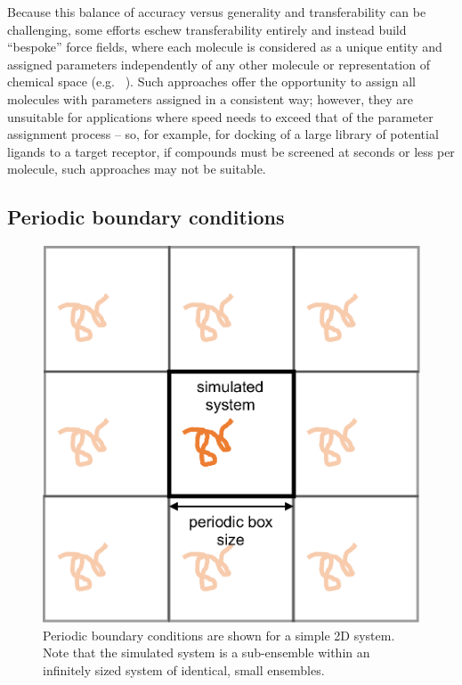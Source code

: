 \documentclass[9pt,bestpractices]{livecoms}
\begin{document}
Because this balance of accuracy versus generality and transferability can be challenging, some efforts eschew transferability entirely and instead build ``bespoke'' force fields, where each molecule is considered as a unique entity and assigned parameters independently of any other molecule or representation of chemical space (e.g. ~\cite{Dupradeau:2010:Phys.Chem.Chem.Phys.}).
Such approaches offer the opportunity to assign all molecules with parameters assigned in a consistent way; however, they are unsuitable for applications where speed needs to exceed that of the parameter assignment process -- so, for example, for docking of a large library of potential ligands to a target receptor, if compounds must be screened at seconds or less per molecule, such approaches may not be suitable.


\subsection{Periodic boundary conditions}
\label{sec:periodic}

\begin{figure}[h]
\centering
\includegraphics[width=\linewidth]{PBC_figure.pdf}
\caption{Periodic boundary conditions are shown for a simple 2D system. Note that the simulated system is a sub-ensemble within an infinitely sized system of identical, small ensembles.}
\label{pbcfig}
\end{figure}
\end{document}
